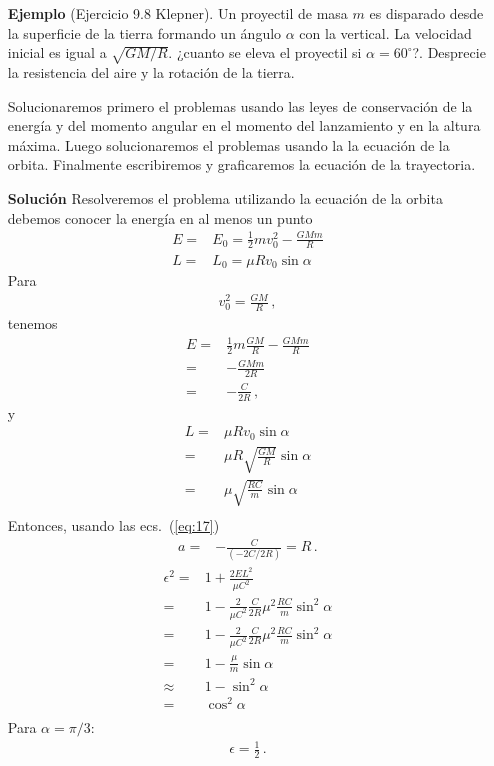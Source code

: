\begin{itemize}
\item[\textbf{Ejemplo}] (Ejercicio 9.8 Klepner). Un proyectil de masa $m$ es disparado desde la superficie de la tierra formando un ángulo $\alpha$ con la vertical. La velocidad inicial es igual a $\sqrt{GM/R}$. ¿cuanto se eleva el proyectil si $\alpha=60^\circ$?. Desprecie la resistencia del aire y la rotación de la tierra. 

Solucionaremos primero el problemas usando las leyes de conservación de la energía y del momento angular en el momento del lanzamiento y en la altura máxima. Luego solucionaremos el problemas usando la la ecuación de la orbita. Finalmente escribiremos y graficaremos la ecuación de la trayectoria.
\item[\textbf{Solución}] Resolveremos el problema utilizando la ecuación de la orbita debemos conocer la energía en al menos un punto
\begin{align}
  E=&E_0=\frac{1}{2}m v_0^2-\frac{GMm}{R}\nonumber\\
  L=&L_0=\mu R v_0 \sin\alpha
\end{align}
Para
\begin{align}
  v_0^2=\frac{GM}{R}\,,
\end{align}
tenemos
\begin{align}
    E=&\frac{1}{2}m\frac{GM}{R} -\frac{GMm}{R}\nonumber\\
    =&-\frac{GMm}{2R}\nonumber\\
   =&-\frac{C}{2R}\,,
\end{align}
y
\begin{align}
  L=&\mu R v_0 \sin\alpha\nonumber\\
  =&\mu R\sqrt{\frac{GM}{R}}\sin\alpha\nonumber\\
  =&\mu \sqrt{\frac{RC}{m}}\sin\alpha\nonumber\\
\end{align}
Entonces, usando las ecs.~(\ref{eq:17})
\begin{align}
\label{eq:24}
  a=&-\frac{C}{(-2C/2R)}=R\,.
\end{align}
\begin{align}
  \epsilon^2=&1+\frac{2EL^2}{\mu C^2}\nonumber\\
  =&1-\frac{2}{\mu C^2}\frac{C}{2R}\mu^2\frac{RC}{m}\sin^2\alpha\nonumber\\
  =&1-\frac{2}{\mu C^2}\frac{C}{2R}\mu^2\frac{RC}{m}\sin^2\alpha\nonumber\\
  =&1-\frac{\mu}{m}\sin\alpha\nonumber\\
  \approx&1-\sin^2\alpha\nonumber\\
  =&\cos^2\alpha\nonumber\\
\end{align}
Para $\alpha=\pi/3$:
\begin{align}
\label{eq:25}
\epsilon=\frac{1}{2}\,.
\end{align}


\end{itemize}
